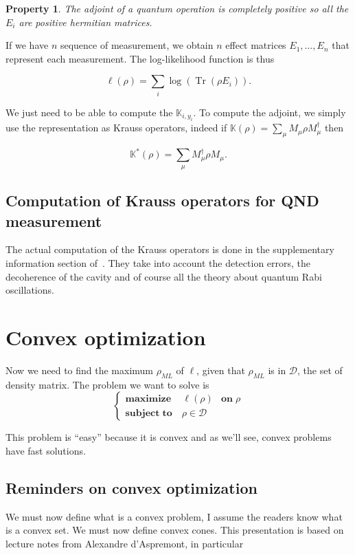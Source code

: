 \documentclass[10pt,a4paper]{report}
\theoremstyle{plain}
\newtheorem{prop}[thm]{Property}
\theoremstyle{definition}
\theoremstyle{remark}
\DeclareMathOperator{\Tr}{Tr}
\newcommand{\ml}{_{M\!L}}
\newcommand{\maxim}[3]{\begin{cases}
    \mathbf{maximize}\,\quad #1& \mathbf{on}\; #2\\
    \mathbf{subject\;to}\quad #3
  \end{cases}}
\begin{document}
\begin{prop}
  The adjoint of a quantum operation is completely positive so all the $E_i$ are
  positive hermitian matrices.
\end{prop}


If we have $n$ sequence of measurement, we obtain $n$ effect
matrices $E_1, \ldots, E_n$ that represent each measurement. The log-likelihood
function is thus

\begin{equation}\label{eqn:ll}
  \ell(\rho) = \sum_i \log (\Tr(\rho E_i)).
\end{equation}

We just need to be able to compute the $\mathbb K_{i,y_i}$.
To compute the adjoint, we simply use the representation as
Krauss operators, indeed if $\mathbb K(\rho) = \sum\limits_\mu M_\mu\rho M_\mu^\dagger$
then

\[\mathbb K^*(\rho) = \sum_\mu M_\mu^\dagger \rho M_\mu.\]

\section{Computation of Krauss operators for QND measurement}

The actual computation of the Krauss operators is done in
the supplementary information section of~\cite{VM19}. They take into account the
detection errors, the decoherence of the cavity and of course all the theory
about quantum Rabi oscillations.

\chapter{Convex optimization}

Now we need to find the maximum $\rho\ml$ of $\ell$, given that $\rho\ml$ is in
$\mathcal{D}$, the set of density matrix. The problem we want to solve is
\[\maxim {\ell(\rho)} \rho {\rho \in \mathcal{D}}\]

This problem is ``easy'' because it is convex and as we'll see, convex problems
have fast solutions.

\section{Reminders on convex optimization}

We must now define what is a convex problem, I assume the readers know what is a
convex set. We must now define convex cones. This presentation is based on
lecture notes from Alexandre d'Aspremont, in particular~\cite{ConvAspr}
\end{document}
